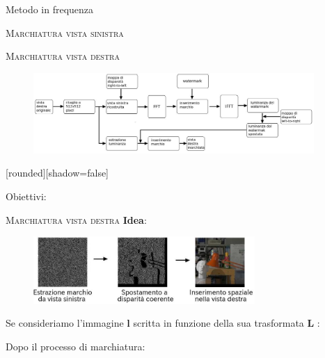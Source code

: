 \documentclass{beamer}
\begin{document}
\begin{section}{Metodo in frequenza}
\begin{frame}[t]{\textsc{Marchiatura vista sinistra}}
\end{frame}



\begin{frame}[t]{\textsc{Marchiatura vista destra}}
\begin{figure}
  \includegraphics[width=0.95\textwidth]{./img_wat/pros.jpg}  
  \label{fig:rightwat}
\end{figure}
[rounded][shadow=false]
\begin{block}{Obiettivi:}
\end{block}
\end{frame}

\begin{frame}[t]{\textsc{Marchiatura vista destra}}
\textbf{Idea}: 
\vspace{-0.8em}
\begin{figure}
  \includegraphics[width=0.75\textwidth]{./img_wat/idea.jpg}
  \label{fig:idea}
\end{figure}
\vspace{-3mm}
Se consideriamo l'immagine  $\mathbf{l}$ scritta in funzione della sua trasformata  $\mathbf{L}$ :
\begin{center}
\end{center}
Dopo il processo di marchiatura: 
\begin{center}
\end{center}


\end{frame}
\end{section}
\end{document}
